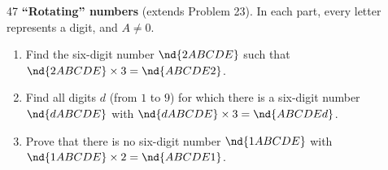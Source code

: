 \begin{probbox}{47}{}
\textbf{``Rotating'' numbers} (extends Problem 23). In each part, every letter represents a digit, and $A\neq 0$.
\begin{enumerate}[label=\alph*),leftmargin=1.6em,itemsep=1pt]
\item Find the six-digit number $\nd{2ABCDE}$ such that $\nd{2ABCDE}\times 3=\nd{ABCDE2}$.
\item Find all digits $d$ (from $1$ to $9$) for which there is a six-digit number $\nd{dABCDE}$ with $\nd{dABCDE}\times 3=\nd{ABCDEd}$.
\item Prove that there is no six-digit number $\nd{1ABCDE}$ with $\nd{1ABCDE}\times 2=\nd{ABCDE1}$.
\end{enumerate}
\end{probbox}
